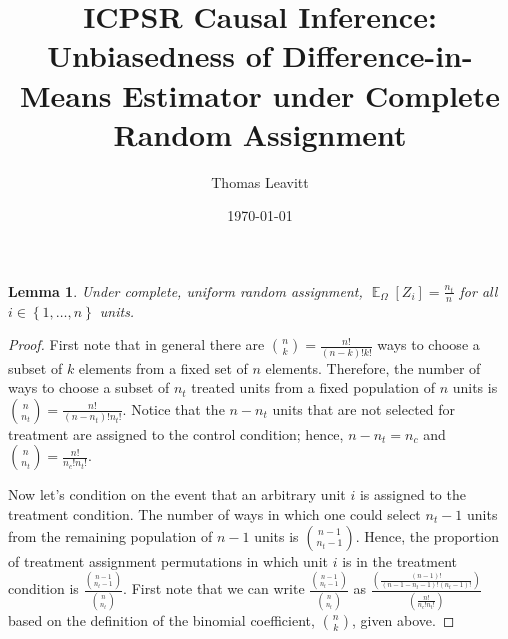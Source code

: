 \documentclass[12pt,leqno]{article}
\theoremstyle{newstyle}
\newtheorem{lem}{Lemma}
\DeclareMathOperator{\E}{\mathbb{E}}
\begin{document}
\begin{titlepage}
\title{ICPSR Causal Inference:\\Unbiasedness of Difference-in-Means Estimator under Complete Random Assignment}
\author{Thomas Leavitt}
\date{\today}
\maketitle
\end{titlepage}

\begin{lem} \label{lem: exp val Z}
Under complete, uniform random assignment, $\E_{\Omega}\left[Z_i\right] = \frac{n_t}{n}$ for all $i \in \left\{1, \dots , n\right\}$ units.
\end{lem}
\begin{proof}

First note that in general there are $\binom{n}{k} = \frac{n!}{\left(n - k\right)!k!}$ ways to choose a subset of $k$ elements from a fixed set of $n$ elements. Therefore, the number of ways to choose a subset of $n_t$ treated units from a fixed population of $n$ units is $\binom{n}{n_t} = \frac{n!}{\left(n - n_t\right)!n_t!}$. Notice that the $n - n_t$ units that are not selected for treatment are assigned to the control condition; hence, $n - n_t = n_c$ and $\binom{n}{n_t} = \frac{n!}{n_c!n_t!}$. 

Now let's condition on the event that an arbitrary unit $i$ is assigned to the treatment condition. The number of ways in which one could select $n_t - 1$ units from the remaining population of $n - 1$ units is $\binom{n - 1}{n_t - 1}$. Hence, the proportion of treatment assignment permutations in which unit $i$ is in the treatment condition is $\frac{\binom{n - 1}{n_t - 1}}{\binom{n}{n_t}}$.
First note that we can write $\frac{\binom{n - 1}{n_t - 1}}{\binom{n}{n_t}}$ as $\frac{\left(\frac{\left(n - 1\right)!}{\left(n - 1 - n_t - 1\right)!\left(n_t - 1\right)!}\right)}{\left(\frac{n!}{n_c!n_t!}\right)}$ based on the definition of the binomial coefficient, $\binom{n}{k}$, given above.


\end{proof}
\end{document}
